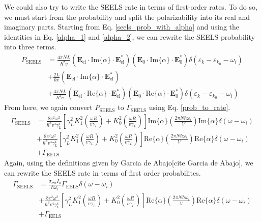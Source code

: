 \documentclass [11pt, proquest] {uwthesis}[2016/11/22]
\begin{document}
We could also try to write the SEELS rate in terms of first-order rates. To do so, we must start from the probability and split the polarizability into its real and imaginary parts. Starting from Eq. \ref{seels_prob_with_alpha} and using the identities in Eq. \ref{alpha_1} and \ref{alpha_2}, we can rewrite the SEELS probability into three terms.
\begin{equation}
\begin{split}
  P_{\textrm{SEELS}} &= \frac{4\pi NL}{\hbar^2v}(\textbf{E}_{\textrm{el}}\cdot\textrm{Im}\{\alpha\}\cdot\textbf{E}_{\textrm{el}}^*)(\textbf{E}_0\cdot\textrm{Im}\{\alpha\}\cdot\textbf{E}_0^*)\delta(\varepsilon_k - \varepsilon_{k_0}-\omega_i)\\
  &+ \frac{2L}{\hbar v}(\textbf{E}_{\textrm{el}}\cdot\textrm{Im}\{\alpha\}\cdot\textbf{E}_{\textrm{el}}^*)\\
  &+ \frac{4\pi NL}{\hbar^2v}(\textbf{E}_{\textrm{el}}\cdot\textrm{Re}\{\alpha\}\cdot\textbf{E}_{\textrm{el}}^*)(\textbf{E}_0\cdot\textrm{Re}\{\alpha\}\cdot\textbf{E}_0^*)\delta(\varepsilon_k - \varepsilon_{k_0}-\omega_i)
  \label{seels_prob_with_alpha}
  \end{split}
\end{equation}
From here, we again convert $P_{\textrm{SEELS}}$ to $\Gamma_{\textrm{SEELS}}$ using Eq. \ref{prob_to_rate}.
\begin{equation}
\begin{split}
  \Gamma_{\textrm{SEELS}} &= \frac{8 e^2 \omega^2}{\hbar^3v^4\gamma_L^4}\left[\gamma_{L}^2K_1^2\left(\frac{\omega R}{v\gamma_L}\right)+K_0^2\left(\frac{\omega R}{v\gamma_L}\right)\right]\textrm{Im}\{\alpha\}\left(\frac{2\pi N\hbar\omega_i}{V}\right)\textrm{Im}\{\alpha\}\delta(\omega-\omega_i)\\
  &+ \frac{8 e^2 \omega^2}{\hbar^3v^4\gamma_L^4}\left[\gamma_{L}^2K_1^2\left(\frac{\omega R}{v\gamma_L}\right)+K_0^2\left(\frac{\omega R}{v\gamma_L}\right)\right]\textrm{Re}\{\alpha\}\left(\frac{2\pi N\hbar\omega_i}{V}\right)\textrm{Re}\{\alpha\}\delta(\omega-\omega_i)\\
  &+ \Gamma_{\textrm{EELS}}
  \label{seels_rate_split}
  \end{split}
\end{equation}
Again, using the definitions given by Garcia de Abajo[cite Garcia de Abajo], we can rewrite the SEELS rate in terms of first order probabilites.
\begin{equation}
\begin{split}
  \Gamma_{\textrm{SEELS}} &= \frac{\sigma_{\textrm{ext}}I_0}{\hbar\omega_i}\Gamma_{\textrm{EELS}}\delta(\omega-\omega_i)\\
  &+ \frac{8 e^2 \omega^2}{\hbar^3v^4\gamma_L^4}\left[\gamma_{L}^2K_1^2\left(\frac{\omega R}{v\gamma_L}\right)+K_0^2\left(\frac{\omega R}{v\gamma_L}\right)\right]\textrm{Re}\{\alpha\}\left(\frac{2\pi N\hbar\omega_i}{V}\right)\textrm{Re}\{\alpha\}\delta(\omega-\omega_i)\\
  &+ \Gamma_{\textrm{EELS}}
  \label{seels_rate_first}
  \end{split}
\end{equation}
\end{document}
